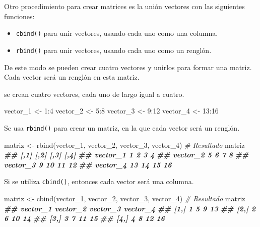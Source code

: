 \documentclass[
]{book}
\newenvironment{Shaded}{\begin{snugshade}}{\end{snugshade}}
\newcommand{\CommentTok}[1]{\textcolor[rgb]{0.56,0.35,0.01}{\textit{#1}}}
\newcommand{\DecValTok}[1]{\textcolor[rgb]{0.00,0.00,0.81}{#1}}
\newcommand{\DocumentationTok}[1]{\textcolor[rgb]{0.56,0.35,0.01}{\textbf{\textit{#1}}}}
\newcommand{\FunctionTok}[1]{\textcolor[rgb]{0.00,0.00,0.00}{#1}}
\newcommand{\NormalTok}[1]{#1}
\newcommand{\OtherTok}[1]{\textcolor[rgb]{0.56,0.35,0.01}{#1}}
\newcommand{\SpecialCharTok}[1]{\textcolor[rgb]{0.00,0.00,0.00}{#1}}
\providecommand{\tightlist}{%
  \setlength{\itemsep}{0pt}\setlength{\parskip}{0pt}}
\begin{document}
Otro procedimiento para crear matrices es la unión vectores con las siguientes funciones:

\begin{itemize}
\tightlist
\item
  \texttt{cbind()} para unir vectores, usando cada uno como una columna.
\item
  \texttt{rbind()} para unir vectores, usando cada uno como un renglón.
\end{itemize}

De este modo se pueden crear cuatro vectores y unirlos para formar una matriz. Cada vector será un renglón en esta matriz.

se crean cuatro vectores, cada uno de largo igual a cuatro.

\begin{Shaded}
\begin{Highlighting}[]
\NormalTok{vector\_1 }\OtherTok{\textless{}{-}} \DecValTok{1}\SpecialCharTok{:}\DecValTok{4}
\NormalTok{vector\_2 }\OtherTok{\textless{}{-}} \DecValTok{5}\SpecialCharTok{:}\DecValTok{8}
\NormalTok{vector\_3 }\OtherTok{\textless{}{-}} \DecValTok{9}\SpecialCharTok{:}\DecValTok{12}
\NormalTok{vector\_4 }\OtherTok{\textless{}{-}} \DecValTok{13}\SpecialCharTok{:}\DecValTok{16}
\end{Highlighting}
\end{Shaded}

Se usa \texttt{rbind()} para crear un matriz, en la que cada vector será un renglón.

\begin{Shaded}
\begin{Highlighting}[]
\NormalTok{matriz }\OtherTok{\textless{}{-}} \FunctionTok{rbind}\NormalTok{(vector\_1, vector\_2, vector\_3, vector\_4)}
\CommentTok{\# Resultado}
\NormalTok{matriz}
\DocumentationTok{\#\#          [,1] [,2] [,3] [,4]}
\DocumentationTok{\#\# vector\_1    1    2    3    4}
\DocumentationTok{\#\# vector\_2    5    6    7    8}
\DocumentationTok{\#\# vector\_3    9   10   11   12}
\DocumentationTok{\#\# vector\_4   13   14   15   16}
\end{Highlighting}
\end{Shaded}

Si se utiliza \texttt{cbind()}, entonces cada vector será una columna.

\begin{Shaded}
\begin{Highlighting}[]
\NormalTok{matriz }\OtherTok{\textless{}{-}} \FunctionTok{cbind}\NormalTok{(vector\_1, vector\_2, vector\_3, vector\_4)}
\CommentTok{\# Resultado}
\NormalTok{matriz}
\DocumentationTok{\#\#      vector\_1 vector\_2 vector\_3 vector\_4}
\DocumentationTok{\#\# [1,]        1        5        9       13}
\DocumentationTok{\#\# [2,]        2        6       10       14}
\DocumentationTok{\#\# [3,]        3        7       11       15}
\DocumentationTok{\#\# [4,]        4        8       12       16}
\end{Highlighting}
\end{Shaded}
\end{document}
